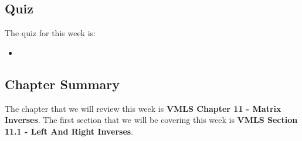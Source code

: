 \subsection{Quiz}

The quiz for this week is:

\begin{itemize}
    \item {}
\end{itemize}

\subsection{Chapter Summary}

The chapter that we will review this week is \textbf{VMLS Chapter 11 - Matrix Inverses}. The first section that we will be covering this week is \textbf{VMLS Section 11.1 - Left And Right Inverses}.

